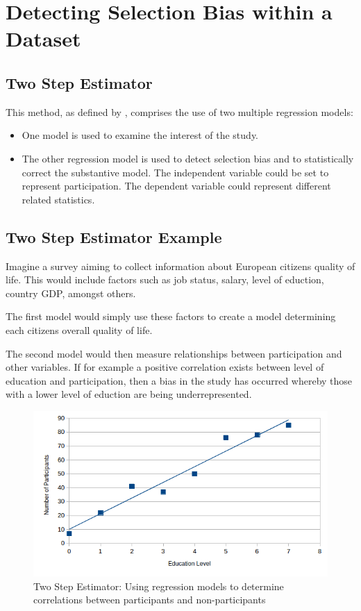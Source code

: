 	
	\section{Detecting Selection Bias within a Dataset}

	\subsection{Two Step Estimator}
	
	This method, as defined by \citet{Heckman1979}, comprises the use of two multiple regression models:
	
	\begin{itemize}
		\item One model is used to examine the interest of the study.
		\item The other regression model is used to detect selection bias and to statistically correct the substantive model. The independent variable could be set to represent participation. The  dependent variable could represent different related statistics.
	\end{itemize}
	
	\subsection{Two Step Estimator Example}
	
	Imagine a survey aiming to collect information about European citizens quality of life. This would include factors such as job status, salary, level of eduction, country GDP, amongst others.
	
The first model would simply use these factors to create a model determining each citizens overall quality of life.

The second model would then measure relationships between participation and other variables. If for example a positive correlation exists between level of education and participation, then a bias in the study has occurred whereby those with a lower level of eduction are being underrepresented.

	\begin{figure}[hbt!]
	\centering
  		\includegraphics[width=0.88\linewidth]{graphics/sample_selection_bias/Education_Correlation_Graph.png}
  		\caption{Two Step Estimator: Using regression models to determine correlations between participants and non-participants}
  		\label{fig:correlation}
	\end{figure}
	
